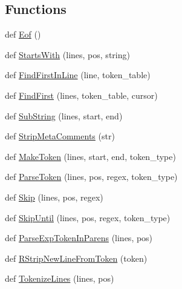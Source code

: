 \subsection*{Functions}
\begin{DoxyCompactItemize}
\item 
def \mbox{\hyperlink{namespacegoogletest_1_1scripts_1_1pump_abae28750e9c44b59243854c9c8249717}{Eof}} ()
\item 
def \mbox{\hyperlink{namespacegoogletest_1_1scripts_1_1pump_a8179e17bde05923198fb01d990bd0361}{Starts\+With}} (lines, pos, string)
\item 
def \mbox{\hyperlink{namespacegoogletest_1_1scripts_1_1pump_a6a0fa99653fbe6b626e3775e62d5a6a3}{Find\+First\+In\+Line}} (line, token\+\_\+table)
\item 
def \mbox{\hyperlink{namespacegoogletest_1_1scripts_1_1pump_aebdca81c221b3c1bcc5d4887ae98eaed}{Find\+First}} (lines, token\+\_\+table, cursor)
\item 
def \mbox{\hyperlink{namespacegoogletest_1_1scripts_1_1pump_ad5f087df98d72b3d0263fd8cd16f9c92}{Sub\+String}} (lines, start, end)
\item 
def \mbox{\hyperlink{namespacegoogletest_1_1scripts_1_1pump_a61b93d0aeb7eacf9e6df72d6094eaaa8}{Strip\+Meta\+Comments}} (str)
\item 
def \mbox{\hyperlink{namespacegoogletest_1_1scripts_1_1pump_a9839cec6b6dc4865995a53363f6fdd67}{Make\+Token}} (lines, start, end, token\+\_\+type)
\item 
def \mbox{\hyperlink{namespacegoogletest_1_1scripts_1_1pump_a905a4c3d715d0faafc8c47dba05cbc77}{Parse\+Token}} (lines, pos, regex, token\+\_\+type)
\item 
def \mbox{\hyperlink{namespacegoogletest_1_1scripts_1_1pump_a7a115eabe50d7cacfbaa2ee78b66d738}{Skip}} (lines, pos, regex)
\item 
def \mbox{\hyperlink{namespacegoogletest_1_1scripts_1_1pump_aee7df3cd9c1ae32452f296556fea978c}{Skip\+Until}} (lines, pos, regex, token\+\_\+type)
\item 
def \mbox{\hyperlink{namespacegoogletest_1_1scripts_1_1pump_ab11d642074e8a73e294eba2bd782f4d3}{Parse\+Exp\+Token\+In\+Parens}} (lines, pos)
\item 
def \mbox{\hyperlink{namespacegoogletest_1_1scripts_1_1pump_ab9cf1749432a8bfc7d3e6db75f079a2c}{R\+Strip\+New\+Line\+From\+Token}} (token)
\item 
def \mbox{\hyperlink{namespacegoogletest_1_1scripts_1_1pump_acbd154dda1c9a3f0fda16dfe31a099de}{Tokenize\+Lines}} (lines, pos)

\end{DoxyCompactItemize}
